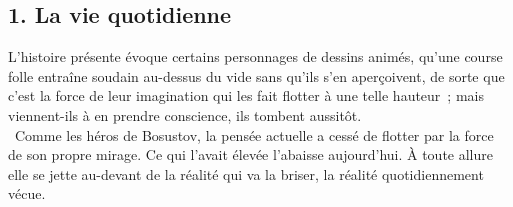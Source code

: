 \documentclass[french,twoside]{book} %
\newcommand{\astermono}{\medskip\centerline{\color{rubric}\large\selectfont{\syms ✻}}\medskip\par}%
\begin{document}
\subsection[{1. La vie quotidienne}]{\textsc{1.} La vie quotidienne}
\noindent L’histoire présente évoque certains personnages de dessins animés, qu’une course folle entraîne soudain au-dessus du vide sans qu’ils s’en aperçoivent, de sorte que c’est la force de leur imagination qui les fait flotter à une telle hauteur ; mais viennent-ils à en prendre conscience, ils tombent aussitôt. \\
 Comme les héros de Bosustov, la pensée actuelle a cessé de flotter par la force de son propre mirage. Ce qui l’avait élevée l’abaisse aujourd’hui. À toute allure elle se jette au-devant de la réalité qui va la briser, la réalité quotidiennement vécue.\par

\astermono
\end{document}
